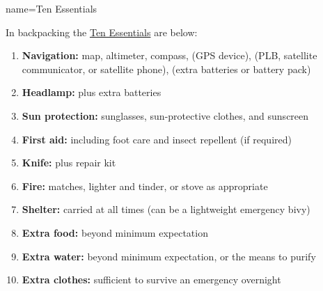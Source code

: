  { name={{Ten Essentials}} }
{
In backpacking the \href{https://www.mountaineers.org/blog/what-are-the-ten-essentials}{Ten Essentials} are below:

\par
\begin{enumerate}
\item {\textbf{Navigation:}} map, altimeter, compass, (GPS device),
 (PLB, satellite communicator, or satellite phone), (extra batteries or battery pack)
\item {\textbf{Headlamp:}} plus extra batteries
\item {\textbf{Sun protection:}} sunglasses, sun-protective clothes, and sunscreen
\item {\textbf{First aid:}} including foot care and insect repellent (if required)
\item {\textbf{Knife:}} plus repair kit
\item {\textbf{Fire:}} matches, lighter and tinder, or stove as appropriate
\item {\textbf{Shelter:}} carried at all times (can be a lightweight emergency bivy)
\item {\textbf{Extra food:}} beyond minimum expectation
\item {\textbf{Extra water:}} beyond minimum expectation, or the means to purify
\item {\textbf{Extra clothes:}} sufficient to survive an emergency overnight
\end{enumerate}

}
